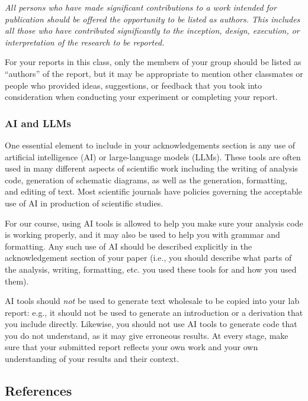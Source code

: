 \documentclass[12pt]{article}
\begin{document}
\textit{All persons who have made significant 
contributions to a work intended for publication should be offered the opportunity 
to be listed as authors. This includes all those who have contributed significantly 
to the inception, design, execution, or interpretation of the research to be reported.}

For your reports in this class, only the members of your group should be listed as
``authors'' of the report, but it may be appropriate to mention other classmates or
people who provided ideas, suggestions, or feedback that you took into consideration 
when conducting your experiment or completing your report.

\subsubsection{AI and LLMs}

One essential element to include in your acknowledgements section is any use of 
artificial intelligence (AI) or large-language models (LLMs). These tools are
often used in many different aspects of scientific work including the writing
of analysis code, generation of schematic diagrams, as well as the generation, 
formatting, and editing of text. Most scientific journals have policies governing
the acceptable use of AI in production of scientific studies.

For our course, using AI tools is allowed to help you make sure your analysis code
is working properly, and it may also be used to help you with grammar and formatting.
Any such use of AI should be described explicitly in the acknowledgement section of 
your paper (i.e., you should describe what parts of the analysis, writing, formatting,
etc. you used these tools for and how you used them).

AI tools should \textit{not} be used to generate text wholesale to be copied into
your lab report: e.g., it should not be used to generate an introduction or a derivation 
that you include directly. Likewise, you should not use AI tools to generate code that you 
do not understand, as it may give erroneous results. At every stage, make sure
that your submitted report reflects your own work and your own understanding of your
results and their context.


\newpage

\subsection{References}
\label{sec:References}
\end{document}
